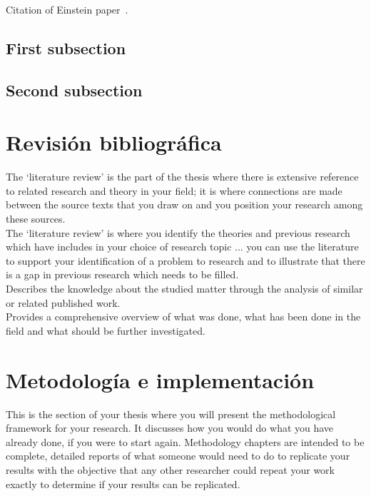 \documentclass[11pt,a4paper,oldfontcommands]{memoir}
\begin{document}
\begin{multicols}{2}
Citation of Einstein paper~\cite{Einstein}.

\subsection{First subsection}

\subsection{Second subsection}

\section{Revisión bibliográfica}
The ‘literature review’ is the part of the thesis where there is
extensive reference to related research and theory in your field; it is
where connections are made between the source texts that you draw
on and you position your research among these sources.
\\

The ‘literature review’ is where you identify the theories and
previous research which have includes in your choice of research
topic ... you can use the literature to support your
identification of a problem to research and to illustrate that there is
a gap in previous research which needs to be filled.
\\

Describes the knowledge about the studied matter through the
analysis of similar or related published work.
\\Provides a comprehensive overview of what was done, what has
been done in the field and what should be further investigated.
\\



\section{Metodología e implementación}
This is the section of your thesis where you will present the methodological framework
for your research. It discusses how you would do what you have already done, if you
were to start again. Methodology chapters are intended to be complete, detailed reports of
what someone would need to do to replicate your results with the objective that any other
researcher could repeat your work exactly to determine if your results can be replicated.
\\


\end{multicols}
\end{document}
